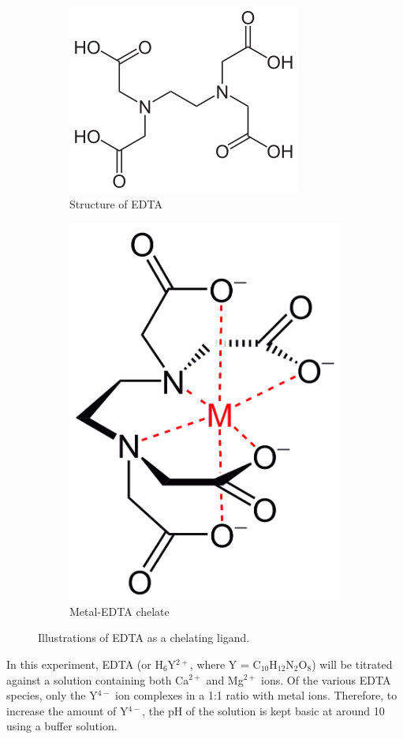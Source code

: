 \documentclass{article}
\begin{document}
\begin{figure}[!hb]
\centering
        \begin{subfigure}{.5\textwidth}
        \centering
                \includegraphics[width=.5\linewidth]{EDTA}
                \caption{Structure of EDTA}
                \label{fig:sub1}
        \end{subfigure}%
        \begin{subfigure}{.5\textwidth}
                \centering
                \includegraphics[width=.4\linewidth]{M_EDTA}
                \caption{Metal-EDTA chelate}
                \label{fig:sub2}
        \end{subfigure}
        \caption{Illustrations of EDTA as a chelating ligand.\cite{EDTA}}
\end{figure}

In this experiment, EDTA (or H$_6$Y$^{2+}$, where Y = C$_{10}$H$_{12}$N$_2$O$_8$) will be titrated
against a solution containing both Ca$^{2+}$ and Mg$^{2+}$ ions.  Of the various EDTA species, only
the Y$^{4-}$ ion complexes in a 1:1 ratio with metal ions.  Therefore, to increase the amount of
Y$^{4-}$, the pH of the solution is kept basic at around 10 using a buffer solution. \cite{mtsu}
\end{document}
